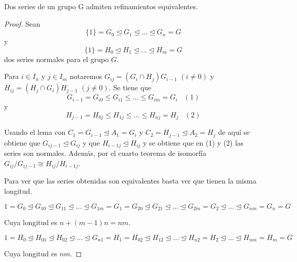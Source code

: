 \begin{nth}
Dos series de un grupo G admiten refinamientos equivalentes.
\end{nth}
\begin{proof}
Sean $$\{1\} = G_0 \trianglelefteq G_1 \trianglelefteq ... \trianglelefteq G_n = G$$ y $$\{1\} = H_0 \trianglelefteq H_1 \trianglelefteq ... \trianglelefteq H_m = G$$ dos series normales para el grupo $G$. 

Para $i \in I_n$ y $j \in I_m$ notaremos $G_{ij} = (G_i \cap H_j)G_{i-1}$ $(i \neq 0)$ y $H_{ij} = (H_{j} \cap G_i) H_{j-1}$ $(j \neq 0)$. Se tiene que $$G_{i-1} = G_{i0} \le G_{i1} \le ... \le G_{im} = G_i \;\;\; (1)$$ y $$H_{j-1} = H_{0j} \le H_{1j} \le ... \le H_{nj} = H_j \;\;\; (2)$$

Usando el lema con $C_1 = G_{i-1} \trianglelefteq A_1 = G_i$ y $C_2 = H_{j-1} \trianglelefteq A_2 = H_j$ de aquí se obtiene que $G_{ij-1} \trianglelefteq G_{ij}$ y que $H_{i-1j} \trianglelefteq H_{ij}$ y se obtiene que en (1) y (2) las series son normales. Además, por el cuarto teorema de isomorfía $G_{ij}/G_{ij-1} \cong H_{ij}/H_{i-1j}$.

Para ver que las series obtenidas son equivalentes basta ver que tienen la misma longitud. 

$1 = G_0 \trianglelefteq G_{10} \trianglelefteq G_{11} \trianglelefteq ... \trianglelefteq G_{1m} = G_1 = G_{20} \trianglelefteq G_{21} \trianglelefteq ... \trianglelefteq G_{2m} = G_2 \trianglelefteq ... \trianglelefteq G_{nm} = G_n = G$

Cuya longitud es $n+(m-1)n = nm$.

$1 = H_0 \trianglelefteq H_{01} \trianglelefteq H_{02} \trianglelefteq ... \trianglelefteq G_{n1} = H_1 = H_{02} \trianglelefteq H_{12} \trianglelefteq ... \trianglelefteq H_{n2} = H_2 \trianglelefteq ... \trianglelefteq H_{nm} = H_m = G$

Cuya longitud es $nm$.
\end{proof}



